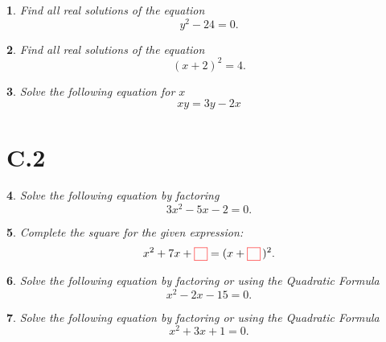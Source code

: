 \documentclass[12pt]{amsart}
\newtheorem{thm}{}
\begin{document}
\setcounter{thm}{34}
\begin{thm}
  Find all real solutions of the equation
  $$y^2 - 24 = 0.$$
\end{thm}

\setcounter{thm}{40}
\begin{thm}
  Find all real solutions of the equation
  $$(x + 2)^2 = 4.$$
\end{thm}

\setcounter{thm}{60}
\begin{thm}
  Solve the following equation for $x$
  $$xy = 3y - 2x$$
\end{thm}

\section*{C.2}

\setcounter{thm}{6}
\begin{thm}
  Solve the following equation by factoring
  $$3x^2 - 5x - 2 = 0.$$
\end{thm}

\setcounter{thm}{10}
\begin{thm}
  Complete the square for the given expression:
  $$x^2 + 7x + {\color{red} \fbox{\raisebox{5px}{\hspace{5px}}}} = (x + {\color{red} \fbox{\raisebox{5px}{\hspace{5px}}}}\,)^2.$$
\end{thm}

\setcounter{thm}{22}
\begin{thm}
  Solve the following equation by factoring or using the Quadratic Formula
  $$x^2 - 2x - 15 = 0.$$
\end{thm}

\setcounter{thm}{26}
\begin{thm}
  Solve the following equation by factoring or using the Quadratic Formula
  $$x^2 + 3x + 1 = 0.$$
\end{thm}
\end{document}
